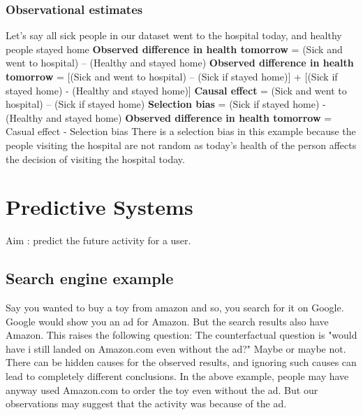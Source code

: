 \documentclass[a4paper]{article}
\begin{document}
\subsubsection*{Observational estimates}
Let’s say all sick people in our dataset went to the hospital today, and healthy people stayed home \newline
\textbf {Observed difference in health tomorrow}  = (Sick and went to hospital) – (Healthy and stayed home) \newline
\textbf {Observed difference in health tomorrow} = [(Sick and went to hospital) – (Sick if stayed home)] + [(Sick if stayed home) - (Healthy and stayed home)] \newline
\textbf{Causal effect} = (Sick and went to hospital) – (Sick if stayed home) \newline
\textbf {Selection bias} = (Sick if stayed home) - (Healthy and stayed home) \newline
\textbf {Observed difference in health tomorrow} = Casual effect - Selection bias \newline
There is a selection bias in this example because the people visiting the hospital are not random as today's health of the person affects the decision of visiting the hospital today.

\section{Predictive Systems}
Aim : predict the future activity for a user.

\subsection{Search engine example}
Say you wanted to buy a toy from amazon and so, you search for it on Google. Google would show you an ad for Amazon. \newline
But the search results also have Amazon. This raises the following question: \newline
The counterfactual question is "would have i still landed on Amazon.com even without the ad?" \newline
Maybe or maybe not.\newline
There can be hidden causes for the observed results, and ignoring such causes can lead to completely different conclusions. \newline
In the above example, people may have anyway used Amazon.com to order the toy even without the ad. But our observations may suggest that the activity was because of the ad.
\end{document}
